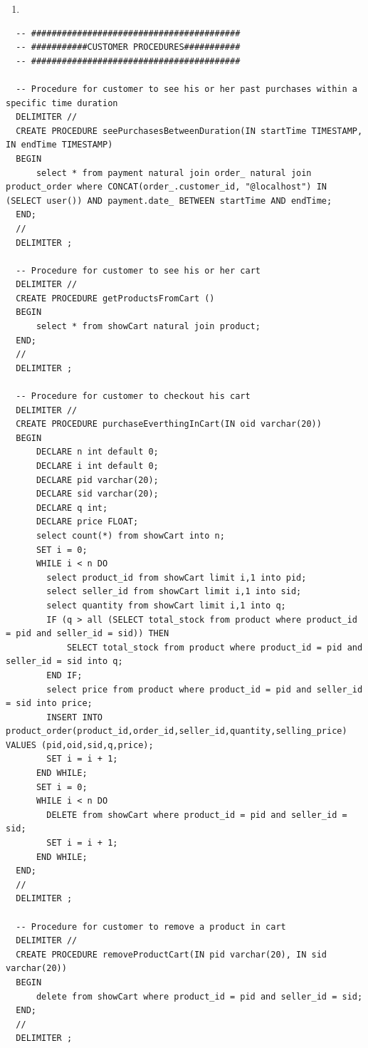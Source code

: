 \documentclass[a4paper,12pt]{article}
\begin{document}
\begin{enumerate}
  \item 
\end{enumerate}
\begin{verbatim}
  -- #########################################
  -- ###########CUSTOMER PROCEDURES###########
  -- #########################################
  
  -- Procedure for customer to see his or her past purchases within a specific time duration
  DELIMITER //
  CREATE PROCEDURE seePurchasesBetweenDuration(IN startTime TIMESTAMP, IN endTime TIMESTAMP)
  BEGIN
      select * from payment natural join order_ natural join product_order where CONCAT(order_.customer_id, "@localhost") IN (SELECT user()) AND payment.date_ BETWEEN startTime AND endTime;
  END;
  //
  DELIMITER ;
  
  -- Procedure for customer to see his or her cart
  DELIMITER //
  CREATE PROCEDURE getProductsFromCart ()
  BEGIN
      select * from showCart natural join product;
  END;
  //
  DELIMITER ;
  
  -- Procedure for customer to checkout his cart
  DELIMITER //
  CREATE PROCEDURE purchaseEverthingInCart(IN oid varchar(20)) 
  BEGIN
      DECLARE n int default 0;
      DECLARE i int default 0;
      DECLARE pid varchar(20);
      DECLARE sid varchar(20);
      DECLARE q int;
      DECLARE price FLOAT;
      select count(*) from showCart into n;
      SET i = 0;
      WHILE i < n DO 
        select product_id from showCart limit i,1 into pid; 
        select seller_id from showCart limit i,1 into sid; 
        select quantity from showCart limit i,1 into q; 
        IF (q > all (SELECT total_stock from product where product_id = pid and seller_id = sid)) THEN
            SELECT total_stock from product where product_id = pid and seller_id = sid into q;
        END IF;
        select price from product where product_id = pid and seller_id = sid into price;
        INSERT INTO product_order(product_id,order_id,seller_id,quantity,selling_price) VALUES (pid,oid,sid,q,price);
        SET i = i + 1;
      END WHILE;
      SET i = 0;
      WHILE i < n DO
        DELETE from showCart where product_id = pid and seller_id = sid;
        SET i = i + 1;
      END WHILE;
  END;
  //
  DELIMITER ;
  
  -- Procedure for customer to remove a product in cart 
  DELIMITER //
  CREATE PROCEDURE removeProductCart(IN pid varchar(20), IN sid varchar(20))
  BEGIN
      delete from showCart where product_id = pid and seller_id = sid;
  END;
  //
  DELIMITER ;
  

\end{verbatim}
\end{document}
